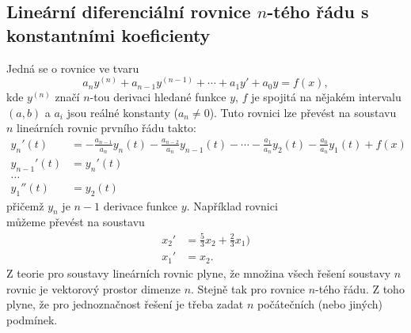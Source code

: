 \subsection{Lineární diferenciální rovnice $n$-tého řádu s konstantními koeficienty}
Jedná se o rovnice ve tvaru
   \[
      a_n y^{(n)}+a_{n-1}y^{(n-1)}+\cdots+a_1y'+a_0y = f(x),
   \]
kde $y^{(n)}$ značí $n$-tou derivaci hledané funkce $y$, $f$ je spojitá na nějakém intervalu $(a,b)$ a $a_i$
jsou reálné konstanty ($a_n\neq 0$). Tuto rovnici lze převést na soustavu $n$ lineárních rovnic prvního řádu takto:
\begin{align}
       y_n'(t)&=-\frac{a_{n-1}}{a_n} y_{n}(t) -\frac{a_{n-2}}{a_n} y_{n-1}(t) - \cdots - \frac{a_1}{a_n} y_2(t) - \frac{a_0}{a_n} y_1(t) +f(x)\\
       y_{n-1}'(t)&=y_n'(t)\\
       \dots  \\
       y_1''(t)&=y_2(t) 
\end{align}
přičemž $y_n$ je $n-1$ derivace funkce $y$. Například rovnici
\begin{equation}\label{reseny_n-radu}
\end{equation}
můžeme převést na soustavu
\begin{align*}
        x_2'&=\frac53x_2+\frac23x_1)\\
        x_1'&=x_2.
\end{align*}
Z teorie pro soustavy lineárních rovnic plyne, že množina všech řešení soustavy $n$ rovnic je vektorový prostor dimenze $n$. 
Stejně tak pro rovnice $n$-tého řádu. Z toho plyne, že pro jednoznačnost řešení je třeba zadat $n$ počátečních (nebo jiných) podmínek.







